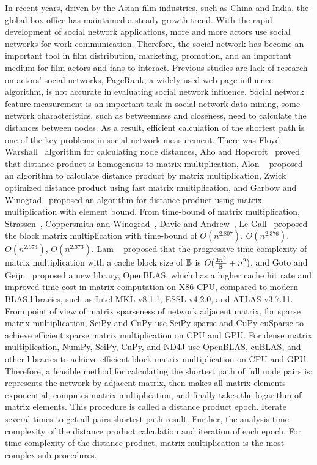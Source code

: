 \documentclass[review]{cvpr}
\begin{document}
In recent years, driven by the Asian film industries, such as China and India, the global box office has maintained a steady growth trend.
With the rapid development of social network applications, more and more actors use social networks for work communication.
Therefore, the social network has become an important tool in film distribution, marketing, promotion, and an important medium for film actors and fans to interact.
Previous studies are lack of research on actors' social networks, PageRank, a widely used web page influence algorithm, is not accurate in evaluating social network influence.
Social network feature measurement is an important task in social network data mining, some network characteristics, such as betweenness and closeness, need to calculate the distances between nodes.
As a result, efficient calculation of the shortest path is one of the key problems in social network measurement.
There was Floyd-Warshall~\cite{floyd1962algorithm,warshall1962theorem} algorithm for calculating node distances, Aho and Hopcroft~\cite{aho1974design} proved that distance product is homogenous to matrix multiplication,
Alon \etal~\cite{alon1997exponent} proposed an algorithm to calculate distance product by matrix multiplication, Zwick~\cite{zwick2002all} optimized distance product using fast matrix multiplication,
and Garbow and Winograd~\cite{garbow1985scaling} proposed an algorithm for distance product using matrix multiplication with element bound.
From time-bound of matrix multiplication, Strassen~\cite{strassen1969gaussian}, Coppersmith and Winograd~\cite{coppersmith1987matrix}, Davie and Andrew~\cite{davie2013improved}, Le Gall~\cite{le2014powers} proposed the block matrix multiplication with time-bound of \(O(n ^ {2.807})\), \(O(n^{2.376})\), \(O(n^{2.374})\), \(O(n^{2.373})\).
Lam \etal~\cite{lam1991cache} proposed that the progressive time complexity of matrix multiplication with a cache block size of $\Bbb B$ is \(O({2n^3 \over \Bbb B}+{n^2})\),
and Goto and Geijn~\cite{goto2008anatomy} proposed a new library, OpenBLAS, which has a higher cache hit rate and improved time cost in matrix computation on X86 CPU, compared to modern BLAS libraries, such as Intel MKL v8.1.1, ESSL v4.2.0, and ATLAS v3.7.11.
From point of view of matrix sparseness of network adjacent matrix, for sparse matrix multiplication, SciPy and CuPy use SciPy-sparse and CuPy-cuSparse to achieve efficient sparse matrix multiplication on CPU and GPU.
For dense matrix multiplication, NumPy, SciPy, CuPy, and ND4J use OpenBLAS, cuBLAS, and other libraries to achieve efficient block matrix multiplication on CPU and GPU.
Therefore, a feasible method for calculating the shortest path of full node pairs is: represents the network by adjacent matrix, then makes all matrix elements exponential, computes matrix multiplication, and finally takes the logarithm of matrix elements.
This procedure is called a distance product epoch.
Iterate several times to get all-pairs shortest path result.
Further, the analysis time complexity of the distance product calculation and iteration of each epoch.
For time complexity of the distance product, matrix multiplication is the most complex sub-procedures.
\end{document}
